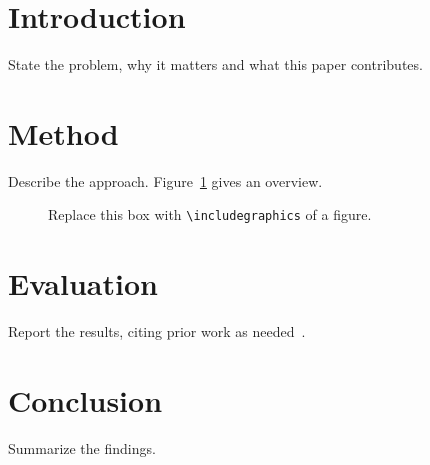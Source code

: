 \section{Introduction}\label{sec:intro}
State the problem, why it matters and what this paper contributes.

\section{Method}\label{sec:method}
Describe the approach. Figure~\ref{fig:overview} gives an overview.

\begin{figure}[t]
  \centering
  \fbox{\rule{0pt}{2cm}\rule{0.6\linewidth}{0pt}}
  \caption{Replace this box with \texttt{\textbackslash includegraphics} of a figure.}
  \label{fig:overview}
\end{figure}

\section{Evaluation}\label{sec:eval}
Report the results, citing prior work as needed~\cite{knuth1984literate}.

\section{Conclusion}\label{sec:conclusion}
Summarize the findings.
